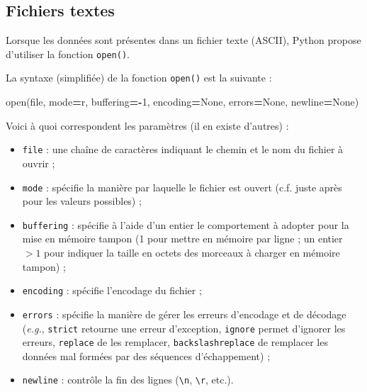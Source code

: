 \documentclass[
  12pt,
]{book}
\newenvironment{Shaded}{\begin{snugshade}}{\end{snugshade}}
\newcommand{\BuiltInTok}[1]{#1}
\newcommand{\DecValTok}[1]{\textcolor[rgb]{0.00,0.00,0.81}{#1}}
\newcommand{\NormalTok}[1]{#1}
\newcommand{\OperatorTok}[1]{\textcolor[rgb]{0.81,0.36,0.00}{\textbf{#1}}}
\newcommand{\StringTok}[1]{\textcolor[rgb]{0.31,0.60,0.02}{#1}}
\newcommand{\VariableTok}[1]{\textcolor[rgb]{0.00,0.00,0.00}{#1}}
\providecommand{\tightlist}{%
  \setlength{\itemsep}{0pt}\setlength{\parskip}{0pt}}
\numberwithin{equation}{section}
\numberwithin{countremarque}{section}
\begin{document}
\subsection{Fichiers textes}\label{import-fichiers-texte}

Lorsque les données sont présentes dans un fichier texte (ASCII), Python propose d'utiliser la fonction \texttt{open()}.

La syntaxe (simplifiée) de la fonction \texttt{open()} est la suivante :

\begin{Shaded}
\begin{Highlighting}[]
\BuiltInTok{open}\NormalTok{(}\BuiltInTok{file}\NormalTok{, mode}\OperatorTok{=}\StringTok{\textquotesingle{}r\textquotesingle{}}\NormalTok{, buffering}\OperatorTok{={-}}\DecValTok{1}\NormalTok{,}
\NormalTok{  encoding}\OperatorTok{=}\VariableTok{None}\NormalTok{, errors}\OperatorTok{=}\VariableTok{None}\NormalTok{, newline}\OperatorTok{=}\VariableTok{None}\NormalTok{)}
\end{Highlighting}
\end{Shaded}

Voici à quoi correspondent les paramètres (il en existe d'autres) :

\begin{itemize}
\tightlist
\item
  \texttt{file} : une chaîne de caractères indiquant le chemin et le nom du fichier à ouvrir ;
\item
  \texttt{mode} : spécifie la manière par laquelle le fichier est ouvert (c.f. juste après pour les valeurs possibles) ;
\item
  \texttt{buffering} : spécifie à l'aide d'un entier le comportement à adopter pour la mise en mémoire tampon (1 pour mettre en mémoire par ligne ; un entier \(>1\) pour indiquer la taille en octets des morceaux à charger en mémoire tampon) ;
\item
  \texttt{encoding} : spécifie l'encodage du fichier ;
\item
  \texttt{errors} : spécifie la manière de gérer les erreurs d'encodage et de décodage (\emph{e.g.}, \texttt{strict} retourne une erreur d'exception, \texttt{ignore} permet d'ignorer les erreurs, \texttt{replace} de les remplacer, \texttt{backslashreplace} de remplacer les données mal formées par des séquences d'échappement) ;
\item
  \texttt{newline} : contrôle la fin des lignes (\texttt{\textbackslash{}n}, \texttt{\textbackslash{}r}, etc.).
\end{itemize}
\end{document}
